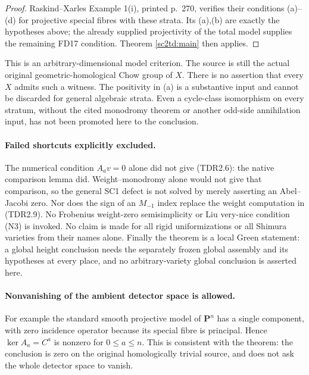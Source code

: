 \begin{proof}
Raskind--Xarles Example 1(i), printed p.~270, verifies their
conditions (a)--(d) for projective special fibres with these strata.
Its (a),(b) are exactly the hypotheses above; the already supplied
projectivity of the total model supplies the remaining FD17 condition.
Theorem \ref{sc2td:main} then applies.
\end{proof}

This is an arbitrary-dimensional model criterion. The source is still
the actual original geometric-homological Chow group of $X$. There is
no assertion that every $X$ admits such a witness. The positivity in
(a) is a substantive input and cannot be discarded for general
algebraic strata. Even a cycle-class isomorphism on every stratum,
without the cited monodromy theorem or another odd-side annihilation
input, has not been promoted here to the conclusion.

\paragraph{Failed shortcuts explicitly excluded.}
The numerical condition $A_av=0$ alone did not give (TDR2.6): the
native comparison lemma did. Weight--monodromy alone would not give
that comparison, so the general SC1 defect is not solved by merely
asserting an Abel--Jacobi zero. Nor does the sign of an $M_{-1}$ index
replace the weight computation in (TDR2.9). No Frobenius weight-zero
semisimplicity or Liu very-nice condition (N3) is invoked. No claim is
made for all rigid uniformizations or all Shimura varieties from their
names alone. Finally the theorem is a local Green statement: a global
height conclusion needs the separately frozen global assembly and its
hypotheses at every place, and no arbitrary-variety global conclusion
is asserted here.

\paragraph{Nonvanishing of the ambient detector space is allowed.}
For example the standard smooth projective model of $\mathbf P^n$
has a single component, with zero incidence operator because its
special fibre is principal. Hence $\ker A_a=C^a$ is nonzero for
$0\leq a\leq n$. This is consistent with the theorem: the conclusion
is zero on the original homologically trivial source, and does not
ask the whole detector space to vanish.
